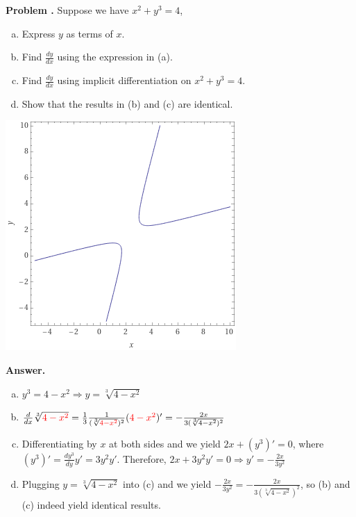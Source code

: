 \documentclass[11pt,letterpaper]{article}
\newcounter{problem}
\newcommand{\problem}{
	\stepcounter{problem}%
	\noindent \textbf{Problem \theproblem. }%
}
\newcommand{\answer}{\noindent \textbf{Answer. }}
\begin{document}
\noindent\begin{minipage}{0.7\textwidth}
    \problem Suppose we have $x^2+y^3=4$,
    \begin{enumerate}[(a)]
        \item Express $y$ as terms of $x$.
        \item Find $\frac{dy}{dx}$ using the expression in (a).
        \item Find $\frac{dy}{dx}$ using implicit differentiation on $x^2+y^3=4$.
        \item Show that the results in (b) and (c) are identical.
    \end{enumerate}
\end{minipage}
\begin{minipage}{0.3\textwidth}
    \begin{center}
        \includegraphics[width = \textwidth]{../graph/A09.png}
    \end{center}
\end{minipage}
\vspace{6mm}

\answer
\begin{enumerate}[(a)]
    \item $y^3 = 4-x^2 \Rightarrow y = \sqrt[3]{4-x^2}$
    \item $\frac{d}{dx}\sqrt[3]{\textcolor{red}{4-x^2}} = \frac{1}{3}\frac{1}{(\sqrt[3]{\textcolor{red}{4-x^2}})^2}(\textcolor{red}{4-x^2})' = -\frac{2x}{3(\sqrt[3]{4-x^2})^2}$
    \item Differentiating by $x$ at both sides and we yield $2x+(y^3)'=0$, where $(y^3)' = \frac{dy^3}{dy}y' = 3y^2y'$.  Therefore, $2x + 3y^2y' = 0 \Rightarrow y' = -\frac{2x}{3y^2}$
    \item Plugging $y = \sqrt[3]{4-x^2}$ into (c) and we yield $-\frac{2x}{3y^2} = -\frac{2x}{3(\sqrt[3]{4-x^2})^2}$, so (b) and (c) indeed yield identical results.
\end{enumerate}\vspace{6mm}
\end{document}
